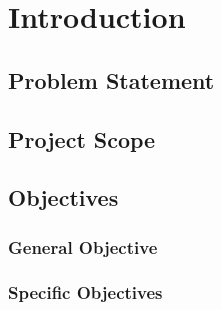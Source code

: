 \chapter{Introduction}


 
\section{Problem Statement}



\section{Project Scope}

\section{Objectives}
\subsection{General Objective}
\subsection{Specific Objectives}

